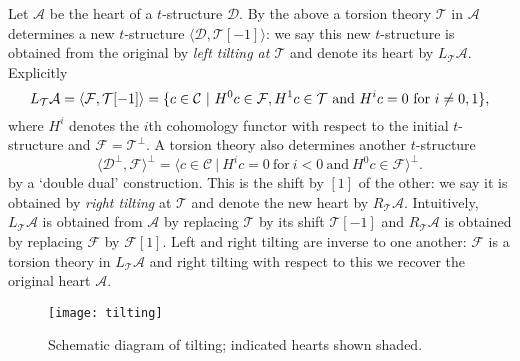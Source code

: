 \documentclass{article}
\theoremstyle{plain}
\theoremstyle{definition}
\theoremstyle{remark}
\newcommand{\defn}[1]{\emph{#1}}
\newcommand{\cat}[1]{\mathcal{#1}}
\begin{document}
Let $\cat{A}$ be the heart of a $t$-structure $\cat{D}$. By the above a torsion theory $\cat{T}$ in $\cat{A}$ determines a new $t$-structure $\langle \cat{D}, \cat{T}[-1] \rangle$: we say this new $t$-structure is obtained from the original by \defn{left tilting at $\cat{T}$} and denote its heart by $L_\cat{T}\cat{A}$. Explicitly
$$
L_\cat{T}\cat{A} = \langle \cat{F} , \cat{T}[-1] \rangle \\
= \{ c \in \cat{C} \ | \ \textrm{$H^{0}c \in \cat{F}, H^1c\in \cat{T}$ and $H^ic=0$ for $i \neq 0,1$} \},
$$
where $H^i$ denotes the $i$th cohomology functor with respect to the initial $t$-structure and $\cat{F}=\cat{T}^\perp$. A torsion theory also determines another $t$-structure 
$$
\langle \cat{D}^\perp, \cat{F} \rangle^\perp = \langle c\in \cat{C}\ |\ H^ic=0 \ \textrm{for}\  i<0 \ \textrm{and}\ H^0c \in \cat{F}\rangle^\perp.
$$
by a `double dual' construction. This is the shift by $[1]$ of the other: we say it is obtained by \defn{right tilting} at $\cat{T}$ and denote the new heart by $R_\cat{T}\cat{A}$.  Intuitively, $L_\cat{T}\cat{A}$ is obtained from $\cat{A}$ by replacing $\cat{T}$ by its shift $\cat{T}[-1]$ and $R_\cat{T}\cat{A}$ is obtained by replacing $\cat{F}$ by $\cat{F}[1]$. Left and right tilting are inverse to one another: $\cat{F}$ is a torsion theory in $L_\cat{T}\cat{A}$ and right tilting with respect to this we recover the original heart $\cat{A}$. 
\begin{figure}[htbp]
\centerline {
\texttt{[image: tilting]}
}
\caption{Schematic diagram of tilting; indicated hearts shown shaded.}
\label{tilting picture}
\end{figure}
\end{document}

